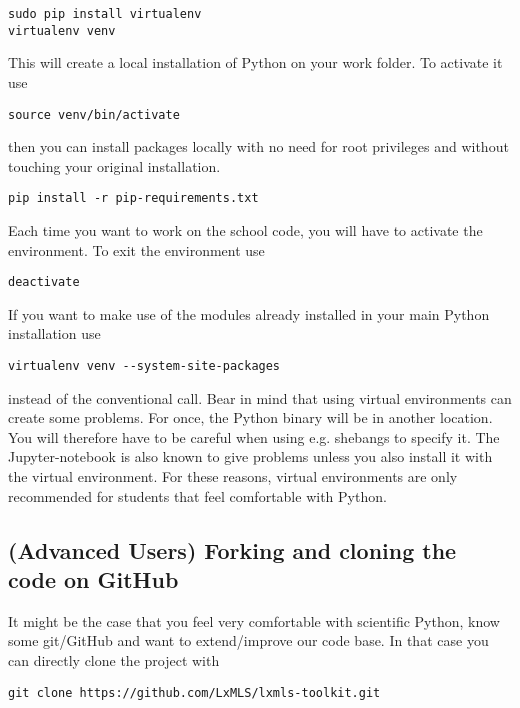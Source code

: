 \begin{verbatim}
sudo pip install virtualenv
virtualenv venv 
\end{verbatim}

\noindent This will create a local installation of Python on your work folder. To activate it use 

\begin{verbatim}
source venv/bin/activate
\end{verbatim}

\noindent then you can install packages locally with no need for root privileges and without touching your original installation.

\begin{verbatim}
pip install -r pip-requirements.txt
\end{verbatim}

\noindent Each time you want to work on the school code, you will have to activate the environment. To exit the environment use 

\begin{verbatim}
deactivate
\end{verbatim}

\noindent If you want to make use of the modules already installed in your main Python installation use

\begin{verbatim}
virtualenv venv --system-site-packages
\end{verbatim}

instead of the conventional call. Bear in mind that using virtual environments can create some problems. For once, the Python binary will be in another location. You will therefore have to be careful when using e.g. shebangs to specify it. The Jupyter-notebook is also known to give problems unless you also install it with the virtual environment. For these reasons, virtual environments are only recommended for students that feel comfortable with Python. 

\subsection{(Advanced Users) Forking and cloning the code on GitHub}

It might be the case that you feel very comfortable with scientific Python, know some git/GitHub and want to extend/improve our code base. In that case you can directly clone the project with

\begin{verbatim}
git clone https://github.com/LxMLS/lxmls-toolkit.git 
\end{verbatim}

